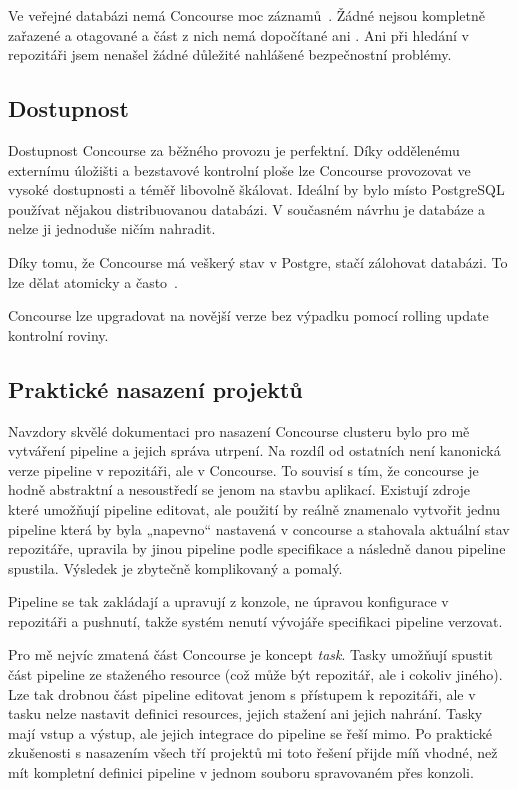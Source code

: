         Ve veřejné databázi  nemá Concourse moc záznamů~\cite{cve-concourse}. Žádné nejsou kompletně zařazené a otagované a část z nich nemá dopočítané ani . Ani při hledání v repozitáři jsem nenašel žádné důležité nahlášené bezpečnostní problémy.

    \subsection{Dostupnost}
        Dostupnost Concourse za běžného provozu je perfektní. Díky oddělenému externímu úložišti a bezstavové kontrolní ploše lze Concourse provozovat ve vysoké dostupnosti a téměř libovolně škálovat. Ideální by bylo místo PostgreSQL používat nějakou distribuovanou  databázi. V současném návrhu je databáze  a nelze ji jednoduše ničím nahradit.

        Díky tomu, že Concourse má veškerý stav v Postgre, stačí zálohovat databázi. To lze dělat atomicky a často~\cite{pg-backup}.

        Concourse lze upgradovat na novější verze bez výpadku pomocí rolling update kontrolní roviny.

    \subsection{Praktické nasazení projektů}
        Navzdory skvělé dokumentaci pro nasazení Concourse clusteru bylo pro mě vytváření pipeline a jejich správa utrpení. Na rozdíl od ostatních \CI není kanonická verze pipeline v repozitáři, ale v Concourse. To souvisí s tím, že concourse je hodně abstraktní a nesoustředí se jenom na stavbu aplikací. Existují zdroje~\cite{concourse-pipeline-res} které umožňují pipeline editovat, ale použití by reálně znamenalo vytvořit jednu pipeline která by byla „napevno“ nastavená v concourse a stahovala aktuální stav repozitáře, upravila by jinou pipeline podle specifikace a následně danou pipeline spustila. Výsledek je zbytečně komplikovaný a pomalý.

        Pipeline se tak zakládají a upravují z konzole, ne úpravou konfigurace v repozitáři a pushnutí, takže systém nenutí vývojáře specifikaci pipeline verzovat.

        Pro mě nejvíc zmatená část Concourse je koncept \textit{task}. Tasky umožňují spustit část pipeline ze staženého resource (což může být repozitář, ale i cokoliv jiného). Lze tak drobnou část pipeline editovat jenom s přístupem k repozitáři, ale v tasku nelze nastavit definici resources, jejich stažení ani jejich nahrání. Tasky mají vstup a výstup, ale jejich integrace do pipeline se řeší mimo. Po praktické zkušenosti s nasazením všech tří projektů mi toto řešení přijde míň vhodné, než mít kompletní definici pipeline v jednom souboru spravovaném přes konzoli.

